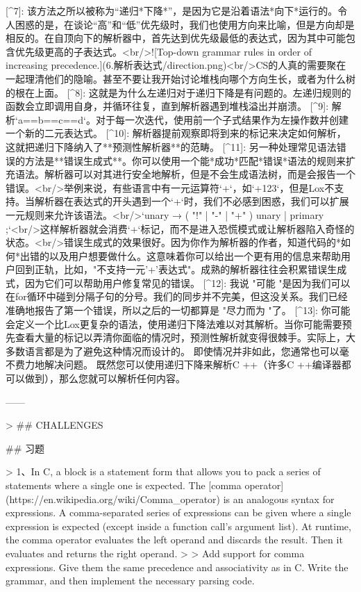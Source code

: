 \documentclass[cn,11pt,chinese]{elegantbook}
\begin{document}
[^7]: 该方法之所以被称为“递归*下降*”，是因为它是沿着语法*向下*运行的。令人困惑的是，在谈论“高”和“低”优先级时，我们也使用方向来比喻，但是方向却是相反的。在自顶向下的解析器中，首先达到优先级最低的表达式，因为其中可能包含优先级更高的子表达式。<br/>![Top-down grammar rules in order of increasing precedence.](6.解析表达式/direction.png)<br/>CS的人真的需要聚在一起理清他们的隐喻。甚至不要让我开始讨论堆栈向哪个方向生长，或者为什么树的根在上面。
[^8]: 这就是为什么左递归对于递归下降是有问题的。左递归规则的函数会立即调用自身，并循环往复，直到解析器遇到堆栈溢出并崩溃。
[^9]: 解析`a==b==c==d`。对于每一次迭代，使用前一个子式结果作为左操作数并创建一个新的二元表达式。
[^10]: 解析器提前观察即将到来的标记来决定如何解析，这就把递归下降纳入了**预测性解析器**的范畴。
[^11]: 另一种处理常见语法错误的方法是**错误生成式**。你可以使用一个能*成功*匹配*错误*语法的规则来扩充语法。解析器可以对其进行安全地解析，但是不会生成语法树，而是会报告一个错误。<br/>举例来说，有些语言中有一元运算符`+`，如`+123`，但是Lox不支持。当解析器在表达式的开头遇到一个`+`时，我们不必感到困惑，我们可以扩展一元规则来允许该语法。<br/>`unary          → ( "!" | "-" | "+" ) unary | primary ;`<br/>这样解析器就会消费`+`标记，而不是进入恐慌模式或让解析器陷入奇怪的状态。<br/>错误生成式的效果很好。因为你作为解析器的作者，知道代码的*如何*出错的以及用户想要做什么。这意味着你可以给出一个更有用的信息来帮助用户回到正轨，比如，"不支持一元'+'表达式"。成熟的解析器往往会积累错误生成式，因为它们可以帮助用户修复常见的错误。
[^12]: 我说 "可能 "是因为我们可以在for循环中碰到分隔子句的分号。我们的同步并不完美，但这没关系。我们已经准确地报告了第一个错误，所以之后的一切都算是 "尽力而为 "了。
[^13]: 你可能会定义一个比Lox更复杂的语法，使用递归下降法难以对其解析。当你可能需要预先查看大量的标记以弄清你面临的情况时，预测性解析就变得很棘手。实际上，大多数语言都是为了避免这种情况而设计的。 即使情况并非如此，您通常也可以毫不费力地解决问题。 既然您可以使用递归下降来解析C ++（许多C ++编译器都可以做到），那么您就可以解析任何内容。



------

> ## CHALLENGES

## 习题

> 1、In C, a block is a statement form that allows you to pack a series of statements where a single one is expected. The [comma operator](https://en.wikipedia.org/wiki/Comma_operator) is an analogous syntax for expressions. A comma-separated series of expressions can be given where a single expression is expected (except inside a function call’s argument list). At runtime, the comma operator evaluates the left operand and discards the result. Then it evaluates and returns the right operand.
>
> Add support for comma expressions. Give them the same precedence and associativity as in C. Write the grammar, and then implement the necessary parsing code.
\end{document}
